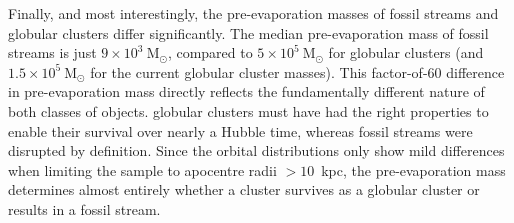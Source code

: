 \documentclass[twocolumn]{aastex63}
\newcommand{\msun}{\ensuremath{\textrm{M}_\odot}}
\begin{document}
Finally, and most interestingly, the pre-evaporation masses of fossil streams and globular clusters differ significantly. The median pre-evaporation mass of fossil streams is just $9\times10^3~\msun$, compared to $5\times10^5~\msun$ for globular clusters (and $1.5\times10^5~\msun$ for the current globular cluster masses). This factor-of-60 difference in pre-evaporation mass directly reflects the fundamentally different nature of both classes of objects. globular clusters must have had the right properties to enable their survival over nearly a Hubble time, whereas fossil streams were disrupted by definition. Since the orbital distributions only show mild differences when limiting the sample to apocentre radii $>10$~kpc, the pre-evaporation mass determines almost entirely whether a cluster survives as a globular cluster or results in a fossil stream.
\end{document}
